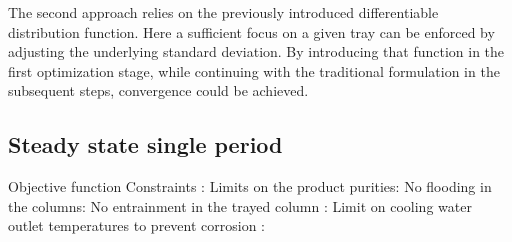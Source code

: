     The second approach relies on the previously introduced differentiable distribution function. Here a sufficient
    focus on a given tray can be enforced by adjusting the underlying standard deviation. By introducing that function
    in the first optimization stage, while continuing with the traditional formulation in the subsequent steps,
    convergence could be achieved.


    \subsection{Steady state single period}
    \label{chp:optexample:ss_single_perid}
    Objective function
    Constraints :
    Limits on the product purities:
    No flooding in the columns:
    No entrainment in the trayed column :
    Limit on cooling water outlet temperatures to prevent corrosion :

